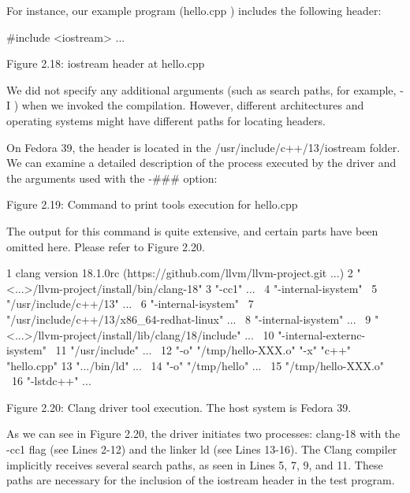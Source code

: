 For instance, our example program (hello.cpp ) includes the following header:

\begin{cpp}
#include <iostream>
...
\end{cpp}

\begin{center}
Figure 2.18: iostream header at hello.cpp
\end{center}

We did not specify any additional arguments (such as search paths, for example, -I ) when we invoked the compilation. However, different architectures and operating systems might have different paths for locating headers.

On Fedora 39, the header is located in the /usr/include/c++/13/iostream folder. We can examine a detailed description of the process executed by the driver and the arguments used with the -\#\#\# option:


\begin{center}
Figure 2.19: Command to print tools execution for hello.cpp
\end{center}

The output for this command is quite extensive, and certain parts have been omitted here. Please refer to Figure 2.20.

\begin{shell}
1   clang version 18.1.0rc (https://github.com/llvm/llvm-project.git ...)
2   "<...>/llvm-project/install/bin/clang-18"
3     "-cc1" ... \
4     "-internal-isystem" \
5     "/usr/include/c++/13" ... \
6     "-internal-isystem" \
7     "/usr/include/c++/13/x86_64-redhat-linux" ... \
8     "-internal-isystem" ... \
9     "<...>/llvm-project/install/lib/clang/18/include" ... \
10    "-internal-externc-isystem" \
11    "/usr/include" ... \
12    "-o" "/tmp/hello-XXX.o" "-x" "c++" "hello.cpp"
13  ".../bin/ld" ... \
14    "-o" "/tmp/hello" ... \
15    "/tmp/hello-XXX.o" \
16    "-lstdc++" ...
\end{shell}

\begin{center}
Figure 2.20: Clang driver tool execution. The host system is Fedora 39.
\end{center}

As we can see in Figure 2.20, the driver initiates two processes: clang-18 with the -cc1 flag (see Lines 2-12) and the linker ld (see Lines 13-16). The Clang compiler implicitly receives several search paths, as seen in Lines 5, 7, 9, and 11. These paths are necessary for the inclusion of the iostream header in the test program.

